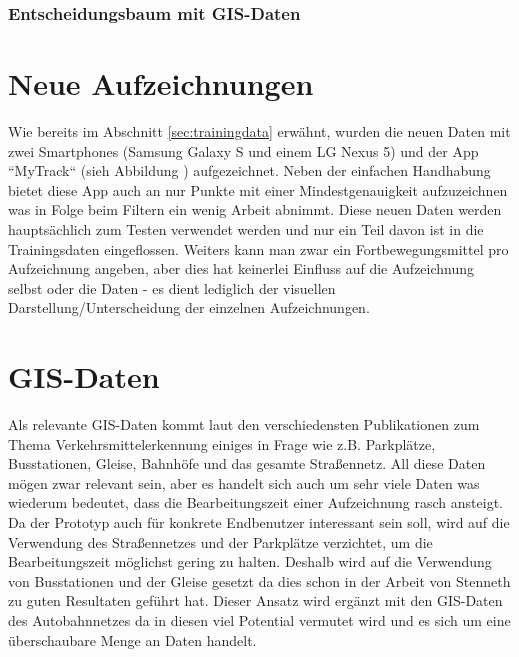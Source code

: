 \clearpage

\subsubsection{Entscheidungsbaum mit GIS-Daten}


\section{Neue Aufzeichnungen}
Wie bereits im Abschnitt \ref{sec:trainingdata} erwähnt, wurden die neuen Daten mit zwei Smartphones (Samsung Galaxy S und einem LG Nexus 5) und der App ``MyTrack`` (sieh Abbildung ) aufgezeichnet. Neben der einfachen Handhabung bietet diese App auch an nur Punkte mit einer Mindestgenauigkeit aufzuzeichnen was in Folge beim Filtern ein wenig Arbeit abnimmt. Diese neuen Daten werden hauptsächlich zum Testen verwendet werden und nur ein Teil davon ist in die Trainingsdaten eingeflossen. Weiters kann man zwar ein Fortbewegungsmittel pro Aufzeichnung angeben, aber dies hat keinerlei Einfluss auf die Aufzeichnung selbst oder die Daten - es dient lediglich der visuellen Darstellung/Unterscheidung der einzelnen Aufzeichnungen.


\section{GIS-Daten}
Als relevante GIS-Daten kommt laut den verschiedensten Publikationen zum Thema Verkehrsmittelerkennung einiges in Frage wie z.B. Parkplätze, Busstationen, Gleise, Bahnhöfe und das gesamte Straßennetz. All diese Daten mögen zwar relevant sein, aber es handelt sich auch um sehr viele Daten was wiederum bedeutet, dass die Bearbeitungszeit einer Aufzeichnung rasch ansteigt. Da der Prototyp auch für konkrete Endbenutzer interessant sein soll, wird auf die Verwendung des Straßennetzes und der Parkplätze verzichtet, um die Bearbeitungszeit möglichst gering zu halten. Deshalb wird auf die Verwendung von Busstationen und der Gleise gesetzt da dies schon in der Arbeit von Stenneth \cite{stenneth_transportation_2011} zu guten Resultaten geführt hat. Dieser Ansatz wird ergänzt mit den GIS-Daten des Autobahnnetzes da in diesen viel Potential vermutet wird und es sich um eine überschaubare Menge an Daten handelt.

